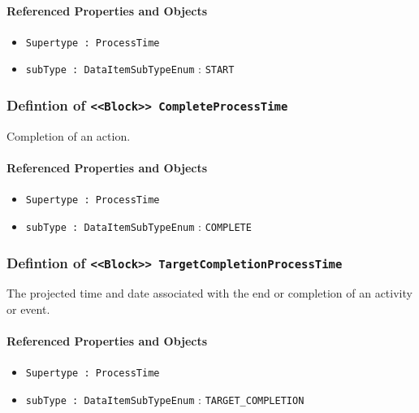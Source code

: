 \FloatBarrier
\paragraph{Referenced Properties and Objects}

\begin{itemize}
\item \texttt{Supertype : ProcessTime}

\item \texttt{subType : DataItemSubTypeEnum} : \texttt{START}

\end{itemize}
\FloatBarrier
\subsubsection{Defintion of \texttt{<<Block>> CompleteProcessTime}}
  \label{type:CompleteProcessTime}

\FloatBarrier

Completion of an action.

\FloatBarrier
\paragraph{Referenced Properties and Objects}

\begin{itemize}
\item \texttt{Supertype : ProcessTime}

\item \texttt{subType : DataItemSubTypeEnum} : \texttt{COMPLETE}

\end{itemize}
\FloatBarrier
\subsubsection{Defintion of \texttt{<<Block>> TargetCompletionProcessTime}}
  \label{type:TargetCompletionProcessTime}

\FloatBarrier

The projected time and date associated with the end or completion of an activity or event.

\FloatBarrier
\paragraph{Referenced Properties and Objects}

\begin{itemize}
\item \texttt{Supertype : ProcessTime}

\item \texttt{subType : DataItemSubTypeEnum} : \texttt{TARGET_COMPLETION}

\end{itemize}
\FloatBarrier
